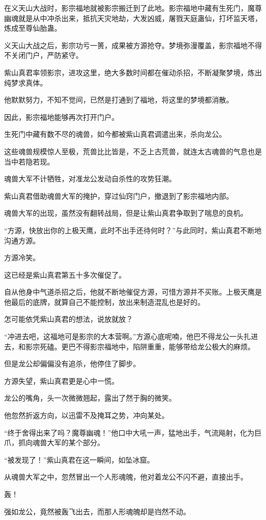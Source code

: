 \begin{this_body}
在义天山大战时，影宗福地就被影宗搬迁到了此地。影宗福地中藏有生死门，魔尊幽魂就是从中冲杀出来，抵抗天灾地劫，大发凶威，屠戮天庭蛊仙，打坏监天塔，炼成至尊仙胎蛊。

义天山大战之后，影宗功亏一篑，成果被方源抢夺。梦境弥漫覆盖，影宗福地不得不关闭门户，严防紧守。

紫山真君率领影宗，进攻这里，绝大多数时间都在催动杀招，不断凝聚梦境，炼出纯梦求真体。

他默默努力，不知不觉间，已然是打通到了福地，将这里的梦境都消散。

因此，影宗福地能够再次打开门户。

生死门中藏有数不尽的魂兽，如今都被紫山真君调遣出来，杀向龙公。

这些魂兽规模惊人至极，荒兽比比皆是，不乏上古荒兽，就连太古魂兽的气息也是当中若隐若现。

魂兽大军不计牺牲，对准龙公发动自杀性的攻势狂潮。

紫山真君借助魂兽大军的掩护，穿过仙窍门户，撤退到了影宗福地内部。

魂兽大军的出现，虽然没有翻转战局，但是让紫山真君争取到了喘息的良机。

“方源，快放出你的上极天鹰，此时不出手还待何时？”与此同时，紫山真君不断地沟通方源。

方源冷笑。

这已经是紫山真君第五十多次催促了。

自从他身中气道杀招之后，他就不断地催促方源，可惜方源并不买账。上极天鹰是他最后的底牌，就算自己不能控制，放出来制造混乱也是好的。

怎可能依凭紫山真君的想法，说放就放？

“冲进去吧，这福地可是影宗的大本营啊。”方源心底呢喃，他巴不得龙公一头扎进去，和影宗死磕。更巴不得影宗福地中，陷阱重重，能够带给龙公极大的麻烦。

但是龙公却偏偏没有追杀，他停住了脚步。

方源失望，紫山真君更是心中一慌。

龙公的嘴角，头一次微微翘起，露出了然于胸的微笑。

他忽然折返方向，以迅雷不及掩耳之势，冲向某处。

“终于舍得出来了吗？魔尊幽魂！”他口中大吼一声，猛地出手，气流飚射，化为巨爪，抓向魂兽大军的某个部分。

“被发现了！”紫山真君在这一瞬间，如坠冰窟。

从魂兽大军之中，忽然冒出一个人形魂魄，他对着龙公不闪不避，直接出手。

轰！

强如龙公，竟然被轰飞出去，而那人形魂魄却是岿然不动。


\end{this_body}
